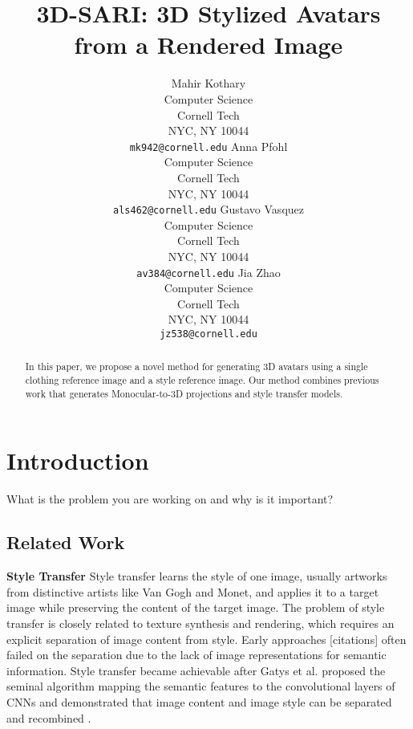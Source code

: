 \documentclass{article}
\title{3D-SARI: 3D Stylized Avatars from a Rendered Image}
\author{%
  Mahir Kothary\\
  Computer Science\\
  Cornell Tech\\
  NYC, NY 10044 \\
  \texttt{mk942@cornell.edu} 
 \And Anna Pfohl\\
  Computer Science\\
  Cornell Tech\\
  NYC, NY 10044 \\
  \texttt{als462@cornell.edu}
\AND
  Gustavo Vasquez \\
  Computer Science\\
  Cornell Tech\\
  NYC, NY 10044 \\
  \texttt{av384@cornell.edu}
\And
  Jia Zhao \\
  Computer Science\\
  Cornell Tech\\
  NYC, NY 10044 \\
  \texttt{jz538@cornell.edu}
}
\begin{document}
\maketitle

\begin{abstract}
In this paper, we propose a novel method for generating 3D avatars using a single clothing reference image and a style reference image. Our method combines previous work that generates Monocular-to-3D projections and style transfer models.
\end{abstract}


\section{Introduction}
What is the problem you are working on and why is it important? 




\subsection{Related Work}

\textbf{Style Transfer} Style transfer learns the style of one image, usually artworks from distinctive artists like Van Gogh and Monet, and applies it to a target image while preserving the content of the target image. The problem of style transfer is closely related to texture synthesis and rendering, which requires an explicit separation of image content from style. Early approaches [citations] often failed on the separation due to the lack of image representations for semantic information. Style transfer became achievable after Gatys et al. proposed the seminal algorithm mapping the semantic features to the convolutional layers of CNNs and demonstrated that image content and image style can be separated and recombined \cite{gatys2016styleTransfer}. 
\end{document}
